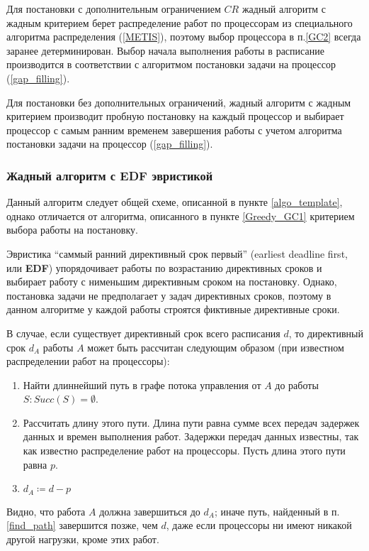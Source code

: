 Для постановки с дополнительным ограничением $CR$ жадный алгоритм с жадным критерием берет распределение работ по процессорам из специального алгоритма распределения (\ref{METIS}), поэтому выбор процессора в п.\ref{GC2} всегда заранее детерминирован. Выбор начала выполнения работы в расписание производится в соответствии с алгоритмом постановки задачи на процессор (\ref{gap_filling}).

Для постановки без дополнительных ограничений, жадный алгоритм с жадным критерием производит пробную постановку на каждый процессор и выбирает процессор с самым ранним временем завершения работы с учетом алгоритма постановки задачи на процессор (\ref{gap_filling}). 

\subsubsection{Жадный алгоритм с EDF эвристикой} \label{Greedy_EDF}
Данный алгоритм следует общей схеме, описанной в пункте \ref{algo_template}, однако отличается от алгоритма, описанного в пункте \ref{Greedy_GC1} критерием выбора работы на постановку.

Эвристика ``саммый ранний директивный срок первый'' (earliest deadline first, или \textbf{EDF}) упорядочивает работы по возрастанию директивных сроков и выбирает работу с нименьшим директивным сроком на постановку. Однако, постановка задачи не предполагает у задач директивных сроков, поэтому в данном алгоритме у каждой работы строятся фиктивные директивные сроки.

В случае, если существует директивный срок всего расписания $d$, то директивный срок $d_A$ работы $A$ может быть рассчитан следующим образом (при известном распределении работ на процессоры):
\begin{enumerate}
    \item \label{find_path} Найти длиннейший путь в графе потока управления от $A$ до работы $S: Succ(S) = \emptyset$.
    \item Рассчитать длину этого пути. Длина пути равна сумме всех передач задержек данных и времен выполнения работ. Задержки передач данных известны, так как известно распределение работ на процессоры. Пусть длина этого пути равна $p$.
    \item $d_A \coloneqq d - p$
\end{enumerate}
Видно, что работа $A$ должна завершиться до $d_A$; иначе путь, найденный в п.\ref{find_path} завершится позже, чем $d$, даже если процессоры ни имеют никакой другой нагрузки, кроме этих работ.

